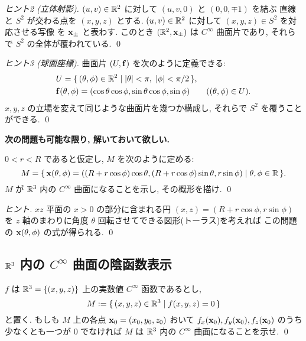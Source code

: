 \documentclass[12pt,twoside]{jarticle}
\begin{document}
\begin{proof}[ヒント2 (立体射影)]
 $(u,v)\in{\mathbb R}^2$ に対して  $(u,v,0)$ と $(0,0,\mp 1)$ を結ぶ
 直線と $S^2$ が交わる点を $(x,y,z)$ とする. 
 $(u,v)\in{\mathbb R}^2$ に対して $(x,y,z)\in S^2$ を対応させる写像
 を ${\mathbf x}_\pm$ と表わす. このとき $({\mathbb R}^2,{\mathbf x}_\pm)$ は $C^\infty$ 曲面片であり, 
 それらで $S^2$ の全体が覆われている. \qed
\end{proof}

\begin{proof}[ヒント3 (球面座標)]
 曲面片 $(U,{\mathbf f})$ を次のように定義できる:
 \begin{align*}
  &
  U = \{\,(\theta,\phi)\in{\mathbb R}^2
      \mid |\theta|<\pi,\; |\phi|<\pi/2 \,\},
  \\ &
  {\mathbf f}(\theta,\phi) = (\cos\theta\cos\phi, \sin\theta\cos\phi, \sin\phi)
  \qquad ((\theta,\phi)\in U).
 \end{align*}
 $x,y,z$ の立場を変えて同じような曲面片を幾つか構成し, 
 それらで $S^2$ を覆うことができる. \qed
\end{proof}

{\bf 次の問題も可能な限り, 解いておいて欲しい.}

\begin{question}[トーラス]
 \label{q:torus1}
 $0<r<R$ であると仮定し, $M$ を次のように定める:
 \begin{equation*}
  M=\{\,
   {\mathbf x}(\theta,\phi)=
   ((R+r\cos\phi)\cos\theta, (R+r\cos\phi)\sin\theta, r\sin\phi)
  \mid \theta,\phi\in{\mathbb R} \,\}.
 \end{equation*}
 $M$ が ${\mathbb R}^3$ 内の $C^\infty$ 曲面になることを示し, 
 その概形を描け.
 \qed
\end{question}

\begin{proof}[ヒント]
 $xz$ 平面の $x>0$ の部分に含まれる円 $(x,z)=(R+r\cos\phi,r\sin\phi)$ 
 を $z$ 軸のまわりに角度 $\theta$ 回転させてできる図形(トーラス)を考えれば
 この問題の ${\mathbf x}(\theta,\phi)$ の式が得られる.
 \qed
\end{proof}


\subsection{${\mathbb R}^3$ 内の $C^\infty$ 曲面の陰函数表示}

\begin{question}[曲面の陰函数表示]
 \label{q:f(x,y,z)=0}
 $f$ は ${\mathbb R}^3=\{(x,y,z)\}$ 上の実数値 $C^\infty$ 函数であるとし, 
 \begin{equation}
  M := \{\,(x,y,z)\in{\mathbb R}^3\mid f(x,y,z)=0 \,\}
 \end{equation}
 と置く. もしも $M$ 上の各点 ${\mathbf x}_0=(x_0,y_0,z_0)$ 
 おいて $f_x({\mathbf x}_0), f_y({\mathbf x}_0), f_z({\mathbf x}_0)$ のうち少なくとも一つが $0$ 
 でなければ $M$ は ${\mathbb R}^3$ 内の $C^\infty$ 曲面になることを示せ. 
 \qed
\end{question}
\end{document}
